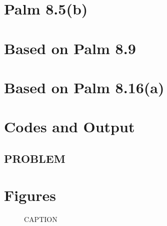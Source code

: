 \documentclass{article}
\begin{document}
\section{Palm 8.5(b)}

\section{Based on Palm 8.9}

\section{Based on Palm 8.16(a)}

\pagebreak
\appendix
\section{Codes and Output}

\subsection{PROBLEM}

\pagebreak
\section{Figures}

\begin{figure}[htb!]
\begin{center}
\caption{CAPTION}
\end{center}
\end{figure}
\end{document}
